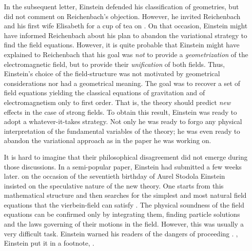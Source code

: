 \documentclass[draft]{article}
\newcommand{\vbein}{vierbein\xspace}
\begin{document}
In the subsequent letter, Einstein defended his classification of geometries, but did not comment on Reichenbach's objection. However, he invited Reichenbach and his first wife Elisabeth for a cup of tea on . On that occasion, Einstein might have informed Reichenbach about his plan to abandon the variational strategy to find the field equations. However, it is quite probable that Einstein might have explained to Reichenbach that his goal was \emph{not} to provide a \emph{geometrization} of the electromagnetic field, but to provide their \emph{unification} of both fields. Thus, Einstein's choice of the field-structure was not motivated by geometrical considerations nor had a geometrical meaning. The goal was to recover a set of field equations yielding the classical equations of gravitation and of electromagnetism only to first order. That is, the theory should predict \emph{new} effects in the case of strong fields. To obtain this result, Einstein was ready to adopt a whatever-it-takes strategy. Not only  he was ready to forgo any physical interpretation of the fundamental variables of the theory; he was even ready to abandon the variational approach as in the paper he was working on. 

It is hard to imagine that their philosophical disagreement did not emerge during those discussions. In a semi-popular paper, Einstein had submitted a few weeks later.  on the occasion of the seventieth birthday of Aurel Stodola\label{stodola} Einstein insisted on the speculative nature of the new theory.  One starts from this mathematical structure and then searches for the simplest and most natural field equations that the \vbein-field can satisfy \citep[131]{Einstein1929}. The physical soundness of the field equations can be confirmed only by integrating them, finding particle solutions and the laws governing of their motions in the field. However, this was usually a very difficult task. Einstein warned his readers of the dangers of proceeding  \citep[127]{Einstein1929}. , Einstein put it in a footnote,  \citep[127]{Einstein1929}.


\end{document}
